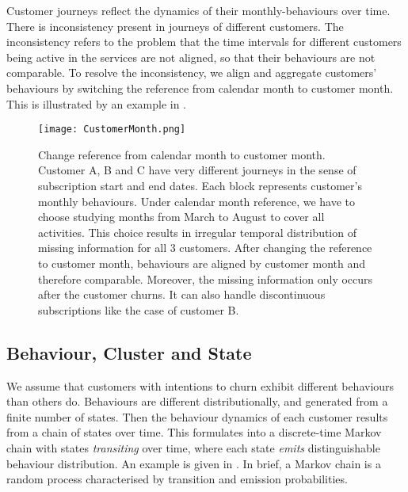 \documentclass[english,a4,oneside,9pt]{extarticle}
\begin{document}
Customer journeys reflect the dynamics of their monthly-behaviours over time. There is inconsistency present in journeys of different customers. The inconsistency refers to the problem that the time intervals for different customers being active in the services are not aligned, so that their behaviours are not comparable. To resolve the inconsistency, we align and aggregate customers' behaviours by switching the reference from calendar month to customer month. This is illustrated by an example in .

\begin{figure}[htb]
\centering
\texttt{[image: CustomerMonth.png]}
\caption{Change reference from calendar month to customer month. Customer A, B and C have very different journeys in the sense of subscription start and end dates. Each block represents customer's monthly behaviours. Under calendar month reference, we have to choose studying months from March to August to cover all activities. This choice results in irregular temporal distribution of missing information for all 3 customers. After changing the reference to customer month, behaviours are aligned by customer month and therefore comparable. Moreover, the missing information only occurs after the customer churns. It can also handle discontinuous subscriptions like the case of customer B.}
\label{fig:customerMonth}
\end{figure} 


\vspace*{-5mm}

\subsection*{Behaviour, Cluster and State}

We assume that customers with intentions to churn exhibit different behaviours than others do. Behaviours are different distributionally, and generated from a finite number of states. Then the behaviour dynamics of each customer results from a chain of states over time. This formulates into a discrete-time Markov chain with states \textit{transiting} over time, where each state \textit{emits} distinguishable behaviour distribution. An example is given in . In brief, a Markov chain is a random process characterised by transition and emission probabilities.
\end{document}
